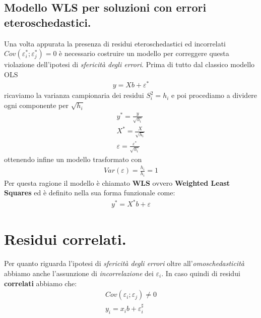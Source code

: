 \documentclass[11pt, twocolumn]{article}
\begin{document}
\subsection*{Modello WLS per soluzioni con errori eteroschedastici.}
Una volta appurata la presenza di residui eteroschedastici ed incorrelati $Cov(\varepsilon_i^*;\varepsilon_j^*) = 0$ è necessario costruire un modello per correggere questa violazione dell'ipotesi di \textit{sfericità degli errori}. Prima di tutto dal classico modello OLS 
\begin{align*}
y = Xb + \varepsilon^*
\end{align*}
ricaviamo la varianza campionaria dei residui $S^2_i = h_i$ e poi procediamo a dividere ogni componente per $\sqrt{h_i}$
\begin{align*}
y^* = \frac{y}{\sqrt{h_i}}\\
X^* = \frac{X}{\sqrt{h_i}}\\
\varepsilon = \frac{\varepsilon^*}{\sqrt{h_i}}
\end{align*}
ottenendo infine un modello trasformato con
\begin{align*}
Var(\varepsilon) = \frac{h_i}{h_i} = 1
\end{align*}
Per questa ragione il modello è chiamato \textbf{WLS} ovvero \textbf{Weighted Least Squares} ed è definito nella sua forma funzionale come:
\begin{align*}
y^* = X^*b + \varepsilon
\end{align*}
\section{Residui correlati.}
Per quanto riguarda l'ipotesi di \textit{sfericità degli errori} oltre all'\textit{omoschedasticità} abbiamo anche l'assunzione di \textit{incorrelazione} dei $\varepsilon_i$. In caso quindi di residui \textbf{correlati} abbiamo che:
\begin{align*}
Cov(\varepsilon_i;\varepsilon_j)\not = 0\\
y_i = x_i b + \varepsilon_i^\sharp
\end{align*} 
\end{document}

